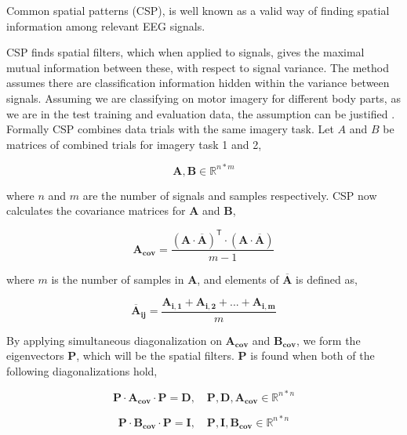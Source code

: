 Common spatial patterns (CSP), is well known as a valid way of finding spatial information among  relevant EEG signals. 

CSP finds spatial filters, which when applied to signals, gives the maximal mutual information between these, with respect to signal variance. The method assumes there are classification information hidden within the variance between signals. Assuming we are classifying on motor imagery for different body parts, as we are in the test training and evaluation data, the assumption can be justified \cite{blankertz2008optimizing}.
Formally CSP combines data trials with the same imagery task. Let $A$ and $B$ be matrices of combined trials for imagery task 1 and 2,

\begin{equation}
\label{eq:csp_data}
\pmb{A}, \pmb{B} \in \mathbb{R}^{n*m}
\end{equation}

where $n$ and $m$ are the number of signals and samples respectively. CSP now calculates the covariance matrices for $\pmb{A}$ and $\pmb{B}$,

\begin{equation}
\label{eq:covariance_matrice}
\pmb{A_{cov}} = \frac{(\pmb{A} \cdot \overline{\pmb{A}})^\mathsf{T}  \cdot (\pmb{A} \cdot \overline{\pmb{A}})}{m - 1}
\end{equation}

where $m$ is the number of samples in $\pmb{A}$, and elements of $\overline{\pmb{A}}$ is defined as,

\begin{equation}
\label{eq:a_bar}
\pmb{\overline{A}_{ij}} = \frac{\pmb{A_{i,1}} + \pmb{A_{i,2}} + ... + \pmb{A_{i,m}}}{m}
\end{equation}

By applying simultaneous diagonalization on $\pmb{A_{cov}}$ and $\pmb{B_{cov}}$, we form the eigenvectors $\pmb{P}$, which will be the spatial filters. $\pmb{P}$ is found when both of the following diagonalizations hold, 

\begin{equation}
\label{eq:diagonalization_A}
\pmb{P} \cdot \pmb{A_{cov}} \cdot \pmb{P} = \pmb{D}, \quad \pmb{P}, \pmb{D}, \pmb{A_{cov}} \in \mathbb{R}^{n*n}
\end{equation}

\begin{equation}
\label{eq:diagonalization_B}
\pmb{P} \cdot \pmb{B_{cov}} \cdot \pmb{P} = \pmb{I}, \quad \pmb{P}, \pmb{I}, \pmb{B_{cov}} \in \mathbb{R}^{n*n}
\end{equation}

